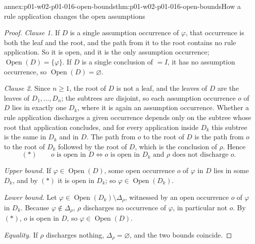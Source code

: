 \begin{annexitem}{annex:p01-w02-p01-016-open-bounds}{thm:p01-w02-p01-016-open-bounds}{How a rule application changes the open assumptions}
\begin{proof}
\emph{Clause 1.} If \(D\) is a single assumption occurrence of
\(\varphi\), that occurrence is both the leaf and the root, and the path from
it to the root contains no rule application. So it is open, and it is the
only assumption occurrence; \(\operatorname{Open}(D)=\{\varphi\}\). If
\(D\) is a single conclusion of \(=I\), it has no assumption occurrence, so
\(\operatorname{Open}(D)=\varnothing\).

\emph{Clause 2.} Since \(n\ge1\), the root of \(D\) is not a leaf, and the
leaves of \(D\) are the leaves of \(D_1,\ldots,D_n\); the subtrees are
disjoint, so each assumption occurrence \(o\) of \(D\) lies in exactly one
\(D_k\), where it is again an assumption occurrence. Whether a rule
application discharges a given occurrence depends only on the subtree whose
root that application concludes, and for every application inside \(D_k\)
this subtree is the same in \(D_k\) and in \(D\). The path from \(o\) to the
root of \(D\) is the path from \(o\) to the root of \(D_k\) followed by the
root of \(D\), which is the conclusion of \(\rho\). Hence
\[
  (\ast)\qquad o\text{ is open in }D
  \iff
  o\text{ is open in }D_k\text{ and }\rho\text{ does not discharge }o .
\]

\emph{Upper bound.} If \(\varphi\in\operatorname{Open}(D)\), some open
occurrence \(o\) of \(\varphi\) in \(D\) lies in some \(D_k\), and by
\((\ast)\) it is open in \(D_k\); so
\(\varphi\in\operatorname{Open}(D_k)\).

\emph{Lower bound.} Let \(\varphi\in\operatorname{Open}(D_k)\setminus
\Delta_\rho\), witnessed by an open occurrence \(o\) of \(\varphi\) in
\(D_k\). Because \(\varphi\notin\Delta_\rho\), \(\rho\) discharges no
occurrence of \(\varphi\), in particular not \(o\). By \((\ast)\), \(o\) is
open in \(D\), so \(\varphi\in\operatorname{Open}(D)\).

\emph{Equality.} If \(\rho\) discharges nothing, \(\Delta_\rho=\varnothing\),
and the two bounds coincide.
\end{proof}
\end{annexitem}

